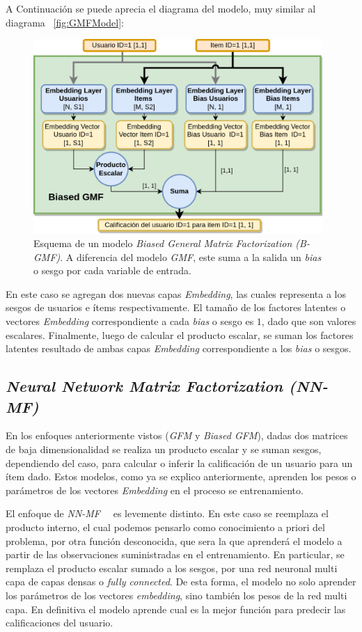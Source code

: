 \documentclass[11pt,a4paper,twoside]{thesis}
\begin{document}
A Continuación se puede aprecia el diagrama del modelo, muy similar al diagrama
~\ref{fig:GMFModel}:

\begin{figure}[h!]
	\centering
	\includegraphics[width=11cm]{./images/Biased-GMF.png}
	\caption{
		Esquema de un modelo \textit{Biased General Matrix Factorization (B-GMF)}.
		A diferencia del modelo \textit{GMF}, este suma a la salida un \textit{bias}
		o sesgo por cada variable de entrada.
	}
	\label{fig:BiasedGMFModel}
\end{figure}

En este caso se agregan dos nuevas capas \textit{Embedding}, las cuales
representa a los sesgos de usuarios e ítems respectivamente. El tamaño de los
factores latentes o vectores \textit{Embedding} correspondiente a cada
\textit{bias} o sesgo es $1$, dado que son valores escalares. Finalmente, luego
de calcular el producto escalar, se suman los factores latentes resultado de
ambas capas \textit{Embedding} correspondiente a los \textit{bias} o sesgos.

\clearpage

\subsection{\textit{Neural Network Matrix Factorization (NN-MF)}}

En los enfoques anteriormente vistos (\textit{GFM} y \textit{Biased GFM}),
dadas dos matrices de baja dimensionalidad se realiza un producto escalar y se
suman sesgos, dependiendo del caso, para calcular o inferir la calificación de
un usuario para un ítem dado. Estos modelos, como ya se explico anteriormente,
aprenden los pesos o parámetros de los vectores \textit{Embedding} en el
proceso se entrenamiento.

El enfoque de {\textit{NN-MF}}~\cite{nnfm}~\cite{ncf} es levemente distinto. En
este caso se reemplaza el producto interno, el cual podemos pensarlo como
conocimiento a priori del problema, por otra función desconocida, que sera la
que aprenderá el modelo a partir de las observaciones suministradas en el
entrenamiento. En particular, se remplaza el producto escalar sumado a los
sesgos, por una red neuronal multi capa de capas densas o \textit{fully
	connected}. De esta forma, el modelo no solo aprender los parámetros de los
vectores \textit{embedding}, sino también los pesos de la red multi capa. En
definitiva el modelo aprende cual es la mejor función para predecir las
calificaciones del usuario.
\end{document}
